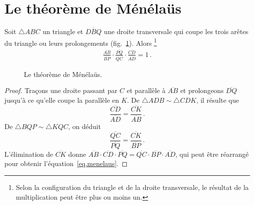 \section{Le théorème de Ménélaüs}\label{a.menelaus}

\begin{theorem}[Ménélaüs]\label{thm.menelaus} 
Soit $\triangle ABC$ un triangle et $\overline{DBQ}$ une droite transversale qui coupe les trois arêtes du triangle ou leurs prolongements (fig.~\ref{f.menelaus}). Alors \footnote{Selon la configuration du triangle et de la droite transversale, le résultat de la multiplication peut être plus ou moins un.}
\begin{align}
\displaystyle\frac{\overline{AB}}{\overline{BP}}\cdot
\displaystyle\frac{\overline{PQ}}{\overline{QC}}\cdot
\displaystyle\frac{\overline{CD}}{\overline{AD}}=1\,.\label{eq.menelaus}
\end{align}
\end{theorem}


\begin{figure}[htbp]
\centering
\caption{Le théorème de Ménélaüs.}\label{f.menelaus}
\end{figure}

\begin{proof}
Traçons une droite passant par $C$ et parallèle à $\overline{AB}$ et prolongeons $\overline{DQ}$ jusqu'à ce qu'elle coupe la parallèle en $K$. De $\triangle ADB \sim \triangle CDK$, il résulte que 
\begin{equation*}
\displaystyle\frac{\overline{CD}}{\overline{AD}}=\displaystyle\frac{\overline{CK}}{\overline{AB}}\,.
\end{equation*}
De $\triangle  BQP\sim \triangle KQC$, on déduit
\begin{equation*}
\displaystyle\frac{\overline{QC}}{\overline{PQ}}=\displaystyle\frac{\overline{CK}}{\overline{BP}}\,.
\end{equation*}
L'élimination de  $\overline{CK}$ donne 
$\overline{AB}\cdot\overline{CD}\cdot\overline{PQ}=\overline{QC}\cdot\overline{BP}\cdot\overline{AD}$,  qui peut être réarrangé pour obtenir l'équation~\ref{eq.menelaus}.
\end{proof}

